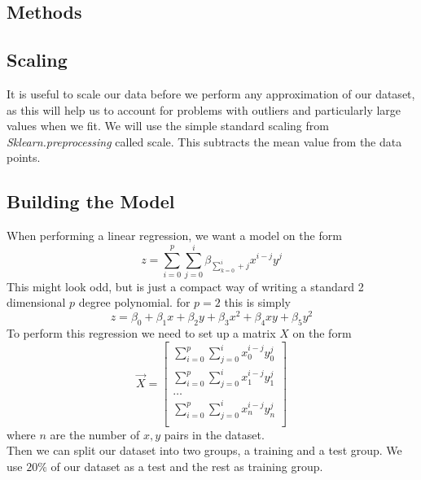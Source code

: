 \documentclass[11pt, A4paper, english]{article}
\begin{document}
\begin{multicols}{2}
		\section{Methods}
			\subsection{Scaling}
It is useful to scale our data before we perform any approximation of our dataset, as this will help us to account for problems with outliers and particularly large values when we fit. We will use the simple standard scaling from \textit{Sklearn.preprocessing} called scale. This subtracts the mean value from the data points.

			\subsection{Building the Model}
When performing a linear regression, we want a model on the form
			\begin{equation}
z = \sum_{i = 0}^{p} \sum_{j = 0}^{i} \beta_{\sum_{k = 0}^{i} + j} x^{i - j}y^{j}
			\end{equation}
This might look odd, but is just a compact way of writing a standard 2 dimensional $p$ degree polynomial. for $p = 2$ this is simply
			\begin{equation*}
z = \beta_0 + \beta_1 x + \beta_2 y + \beta_3 x^2 + \beta_4 xy + \beta_5 y^2 
			\end{equation*}
To perform this regression we need to set up a matrix $X$ on the form
			\begin{equation}
\vec{X} = \left[ \begin{matrix}
\sum_{i = 0}^{p} \sum_{j = 0}^{i} x_0^{i - j}y_0^{j} \\
\sum_{i = 0}^{p} \sum_{j = 0}^{i} x_1^{i - j}y_1^{j} \\
\dots \\
\sum_{i = 0}^{p} \sum_{j = 0}^{i} x_n^{i - j}y_n^{j} \\
\end{matrix} \right]
			\end{equation}
where $n$ are the number of $x, y$ pairs in the dataset. \\
Then we can split our dataset into two groups, a training and a test group. We use $20\%$ of our dataset as a test and the rest as training group.


\end{multicols}
\end{document}

